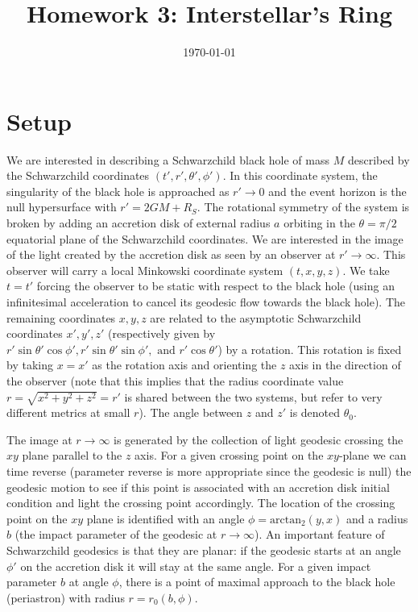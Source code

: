 \documentclass[10pt, a4paper]{article}
\title{Homework 3: Interstellar's Ring} %
\author{\PA} %
\date{\today} %
\begin{document}
\maketitlepage

\maketableofcontents


\section{Setup}
We are interested in describing a Schwarzchild black hole of mass $M$ described by the Schwarzchild coordinates $(t', r', \theta', \phi')$. In this coordinate system, the singularity of the black hole is approached as $r' \to 0$ and the event horizon is the null hypersurface with $r' = 2GM + R_S$. The rotational symmetry of the system is broken by adding an accretion disk of external radius $a$ orbiting in the $\theta = \pi/2$ equatorial plane of the Schwarzchild coordinates. We are interested in the image of the light created by the accretion disk as seen by an observer at $r'\to \infty$. This observer will carry a local Minkowski coordinate system $(t, x, y, z)$. We take $t = t'$ forcing the observer to be static with respect to the black hole (using an infinitesimal acceleration to cancel its geodesic flow towards the black hole). The remaining coordinates $x, y, z$ are related to the asymptotic Schwarzchild coordinates $x', y', z'$ (respectively given by $r' \sin \theta' \cos \phi', r' \sin \theta' \sin \phi', \text{ and } r'\cos \theta'$) by a rotation. This rotation is fixed by taking $x = x'$ as the rotation axis and orienting the $z$ axis in the direction of the observer (note that this implies that the radius coordinate value $r = \sqrt{x^2 + y^2 + z^2} = r'$ is shared between the two systems, but refer to very different metrics at small $r$). The angle between $z$ and $z'$ is denoted $\theta_0$. 

The image at $r\to \infty$ is generated by the collection of light geodesic crossing the $xy$ plane parallel to the $z$ axis. For a given crossing point on the $xy$-plane we can time reverse (parameter reverse is more appropriate since the geodesic is null) the geodesic motion to see if this point is associated with an accretion disk initial condition and light the crossing point accordingly. The location of the crossing point on the $xy$ plane is identified with an angle $\phi = \text{arctan}_2(y, x)$ and a radius $b$ (the impact parameter of the geodesic at $r\to \infty$). An important feature of Schwarzchild geodesics is that they are planar: if the geodesic starts at an angle $\phi'$ on the accretion disk it will stay at the same angle. For a given impact parameter $b$ at angle $\phi$, there is a point of maximal approach to the black hole (periastron) with radius $r = r_0(b, \phi)$.  
\end{document}
